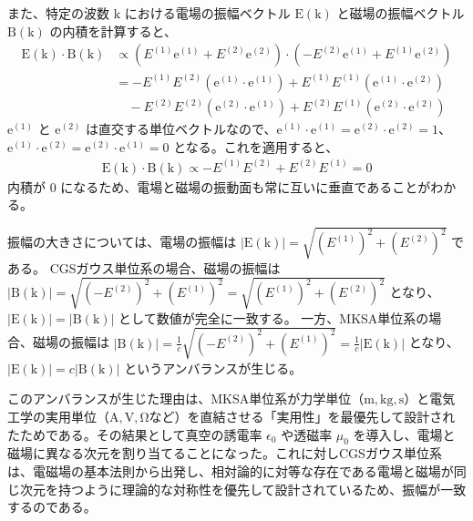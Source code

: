 \documentclass[platex,dvipdfmx,a4paper]{jsarticle}
\newcommand{\vect}[1]{\boldsymbol{\mathrm{#1}}}
\begin{document}
  また、特定の波数 $\vect{k}$ における電場の振幅ベクトル $\vect{E}(\vect{k})$ と磁場の振幅ベクトル $\vect{B}(\vect{k})$ の内積を計算すると、
  \begin{align*}
    \vect{E}(\vect{k}) \cdot \vect{B}(\vect{k}) &\propto \left( E^{(1)}\vect{e}^{(1)} + E^{(2)}\vect{e}^{(2)} \right) \cdot \left( -E^{(2)}\vect{e}^{(1)} + E^{(1)}\vect{e}^{(2)} \right) \\
    &= -E^{(1)}E^{(2)}(\vect{e}^{(1)} \cdot \vect{e}^{(1)}) + E^{(1)}E^{(1)}(\vect{e}^{(1)} \cdot \vect{e}^{(2)}) \\
    &\quad - E^{(2)}E^{(2)}(\vect{e}^{(2)} \cdot \vect{e}^{(1)}) + E^{(2)}E^{(1)}(\vect{e}^{(2)} \cdot \vect{e}^{(2)})
  \end{align*}
  $\vect{e}^{(1)}$ と $\vect{e}^{(2)}$ は直交する単位ベクトルなので、$\vect{e}^{(1)} \cdot \vect{e}^{(1)} = \vect{e}^{(2)} \cdot \vect{e}^{(2)} = 1$、$\vect{e}^{(1)} \cdot \vect{e}^{(2)} = \vect{e}^{(2)} \cdot \vect{e}^{(1)} = 0$ となる。これを適用すると、
  \begin{align*}
    \vect{E}(\vect{k}) \cdot \vect{B}(\vect{k}) \propto -E^{(1)}E^{(2)} + E^{(2)}E^{(1)} = 0
  \end{align*}
  内積が $0$ になるため、電場と磁場の振動面も常に互いに垂直であることがわかる。

  振幅の大きさについては、電場の振幅は $|\vect{E}(\vect{k})| = \sqrt{(E^{(1)})^2 + (E^{(2)})^2}$ である。
  CGSガウス単位系の場合、磁場の振幅は $|\vect{B}(\vect{k})| = \sqrt{(-E^{(2)})^2 + (E^{(1)})^2} = \sqrt{(E^{(1)})^2 + (E^{(2)})^2}$ となり、$|\vect{E}(\vect{k})| = |\vect{B}(\vect{k})|$ として数値が完全に一致する。
  一方、MKSA単位系の場合、磁場の振幅は $|\vect{B}(\vect{k})| = \frac{1}{c} \sqrt{(-E^{(2)})^2 + (E^{(1)})^2} = \frac{1}{c} |\vect{E}(\vect{k})|$ となり、$|\vect{E}(\vect{k})| = c |\vect{B}(\vect{k})|$ というアンバランスが生じる。

  このアンバランスが生じた理由は、MKSA単位系が力学単位（$\mathrm{m, kg, s}$）と電気工学の実用単位（$\mathrm{A, V, \Omega}$など）を直結させる「実用性」を最優先して設計されたためである。その結果として真空の誘電率 $\epsilon_0$ や透磁率 $\mu_0$ を導入し、電場と磁場に異なる次元を割り当てることになった。これに対しCGSガウス単位系は、電磁場の基本法則から出発し、相対論的に対等な存在である電場と磁場が同じ次元を持つように理論的な対称性を優先して設計されているため、振幅が一致するのである。
\end{document}
